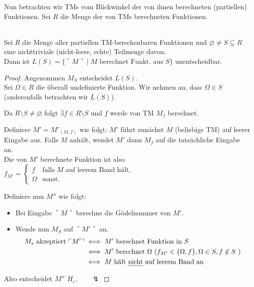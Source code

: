 Nun betrachten wir \ac{TM}s vom Blickwinkel der von ihnen berechneten
(partiellen) Funktionen. Sei $R$ die Menge der von \ac{TM}s berechneten
Funktionen.

\begin{Satz}\ \\
  Sei $R$ die Menge aller partiellen \ac{TM}-berechenbaren Funktionen und
  $\varnothing \neq S \subsetneq R$ eine nichttriviale (nicht-leere,
  echte) Teilmenge davon.\\
  Dann ist $L(S)=\{\ulcorner M \urcorner \mid M \text{ berechnet Funkt. aus
  }S\}$ unentscheidbar.
\end{Satz}
\begin{proof}
  Angenommen $M_S$ entscheidet $L(S)$.\\
  Sei $\Omega \in R$ die überall
  undefinierte Funktion. Wir nehmen an, dass $\Omega \in S$ (anderenfalls betrachten wir $\overline{L(S)}$).
  
  Da $R \setminus S \neq \varnothing$ folgt $\exists f \in R \setminus
  S$ und $f$ werde von \ac{TM} $M_f$ berechnet.
  
  Definiere $M'=M'_{(M, f)}$ wie folgt: $M'$ führt zunächst $M$ (beliebige \ac{TM}) auf leerer Eingabe aus. Falls $M$ anhält, wendet $M'$ dann $M_f$ auf die tatsächliche Eingabe an.\\
  Die von $M'$ berechnete Funktion ist also
  $f_{M'}=\begin{cases}
    f & \text{falls } M \text{ auf leerem Band hält,}\\
    \Omega & \text{sonst.}
  \end{cases}$
  
  Definiere nun $M''$ wie folgt:
  \begin{itemize}
  \item Bei Eingabe $\ulcorner M \urcorner$ berechne die Gödelnummer von $M'$.
  \item Wende nun $M_S$ auf $\ulcorner M' \urcorner$ an.
    \begin{align*}
      M_s\text{ akzeptiert }\ulcorner M' \urcorner
      &\iff M' \text{ berechnet Funktion in }S\\
      &\iff M' \text{ berechnet }\Omega \text{ ($f_{M'} \in \{\Omega, f\}, \Omega \in S, f \notin S$ )}\\
      &\iff M \text{ hält \emph{nicht} auf leerem Band an}
    \end{align*}
  \end{itemize}
  Also entscheidet $M''$ $H_\varepsilon$.$\qquad\lightning$
\end{proof}

